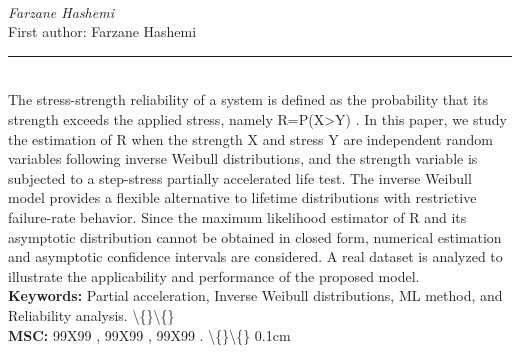 \documentclass[10pt,twoside]{article}
\begin{document}
\noindent\begin{minipage}[t][\textheight]{\textwidth}
\\[0.35em]
{\itshape Farzane Hashemi}\\[0.2em]
{\footnotesize First author: Farzane Hashemi}\\[0.45em]
\noindent\rule{\textwidth}{0.3pt}\\[0.4em]
{\footnotesize  The stress-strength reliability of a system is defined as the probability that its strength exceeds the applied stress, namely R=P(X>Y) . In this paper, we study the estimation of R when the strength X and stress Y are independent random variables following inverse Weibull distributions, and the strength variable is subjected to a step-stress partially accelerated life test. The inverse Weibull model provides a flexible alternative to lifetime distributions with restrictive failure-rate behavior. Since the maximum likelihood estimator of R and its asymptotic distribution cannot be obtained in closed form, numerical estimation and asymptotic confidence intervals are considered. A real dataset is analyzed to illustrate the applicability and performance of the proposed model.}\\[0.4em]
{\footnotesize\bfseries Keywords:} {\footnotesize Partial acceleration, Inverse Weibull distributions, ML method, and Reliability analysis. \textbackslash\{\}\textbackslash\{\}}\\[0.15em]
{\footnotesize\bfseries MSC:} {\footnotesize 99X99 , 99X99 , 99X99 . \textbackslash\{\}\textbackslash\{\} 0.1cm}\\
\vfill
\end{minipage}
\newpage
\end{document}
